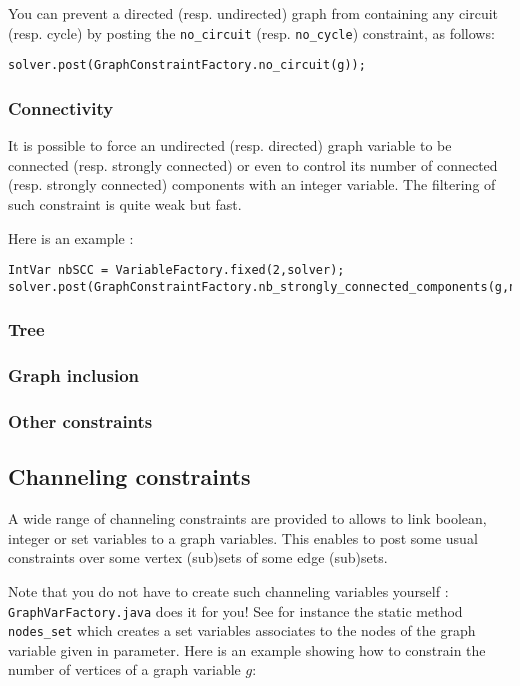 \documentclass{article}
\begin{document}
You can prevent a directed (resp. undirected) graph from containing any circuit (resp. cycle) by posting the \texttt{no\_circuit} (resp. \texttt{no\_cycle}) constraint, as follows:
\begin{lstlisting}
solver.post(GraphConstraintFactory.no_circuit(g));
\end{lstlisting}


\subsubsection{Connectivity}

It is possible to force an undirected (resp. directed) graph variable to be connected (resp. strongly connected) or even to control its number of connected (resp. strongly connected) components with an integer variable. The filtering of such constraint is quite weak but fast.

Here is an example :
\begin{lstlisting}
IntVar nbSCC = VariableFactory.fixed(2,solver);
solver.post(GraphConstraintFactory.nb_strongly_connected_components(g,nbSCC));
\end{lstlisting}

\subsubsection{Tree}
\subsubsection{Graph inclusion}
\subsubsection{Other constraints}

\subsection{Channeling constraints}

A wide range of channeling constraints are provided to allows to link boolean, integer or set variables to a graph variables. 
This enables to post some usual constraints over some vertex (sub)sets of some edge (sub)sets. 

Note that you do not have to create such channeling variables yourself : \texttt{GraphVarFactory.java} does it for you! 
See for instance the static method \texttt{nodes\_set} which creates a set variables associates to the nodes of the graph variable given in parameter. 
Here is an example showing how to constrain the number of vertices of a graph variable $g$: 
\end{document}
